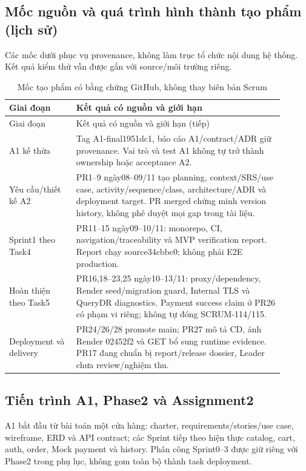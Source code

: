\subsection{Mốc nguồn và quá trình hình thành tạo phẩm (lịch sử)}
Các mốc dưới phục vụ provenance, không làm trục tổ chức nội dung hệ thống.
Kết quả kiểm thử vẫn được gắn với source/môi trường riêng.
\begin{longtable}{>{\raggedright\arraybackslash}p{0.22\linewidth}>{\raggedright\arraybackslash}p{0.68\linewidth}}
\caption{Mốc tạo phẩm có bằng chứng GitHub, không thay biên bản Scrum}\label{tab:milestones}\\
\toprule Giai đoạn & Kết quả có nguồn và giới hạn \\ \midrule
\endfirsthead
\toprule Giai đoạn & Kết quả có nguồn và giới hạn (tiếp) \\ \midrule \endhead
A1 kế thừa & Tag A1-final1951dc1, báo cáo A1/contract/ADR giữ provenance.
Vai trò và test A1 không tự trở thành ownership hoặc acceptance A2. \\
Yêu cầu/thiết kế A2 & PR1--9 ngày08--09/11 tạo planning, context/SRS/use case,
activity/sequence/class, architecture/ADR và deployment target. PR merged
chứng minh version history, không phê duyệt mọi gap trong tài liệu. \\
Sprint1 theo Task4 & PR11--15 ngày09--10/11: monorepo, CI, navigation/traceability
và MVP verification report. Report chạy source34cbbc0; không phải E2E production. \\
Hoàn thiện theo Task5 & PR16,18--23,25 ngày10--13/11: proxy/dependency,
Render seed/migration guard, Internal TLS và QueryDR diagnostics. Payment
success claim ở PR26 có phạm vi riêng; không tự đóng SCRUM-114/115. \\
Deployment và delivery & PR24/26/28 promote main; PR27 mô tả CD, ảnh Render
02452f2 và GET bổ sung runtime evidence. PR17 đang chuẩn bị report/release
dossier, Leader chưa review/nghiệm thu. \\
\bottomrule
\end{longtable}

\subsection{Tiến trình A1, Phase2 và Assignment2}
A1 bắt đầu từ bài toán một cửa hàng: charter, requirements/stories/use case,
wireframe, ERD và API contract; các Sprint tiếp theo hiện thực catalog, cart,
auth, order, Mock payment và history. Phân công Sprint0--3 được giữ riêng với
Phase2 trong phụ lục, không gom toàn bộ thành task deployment.

